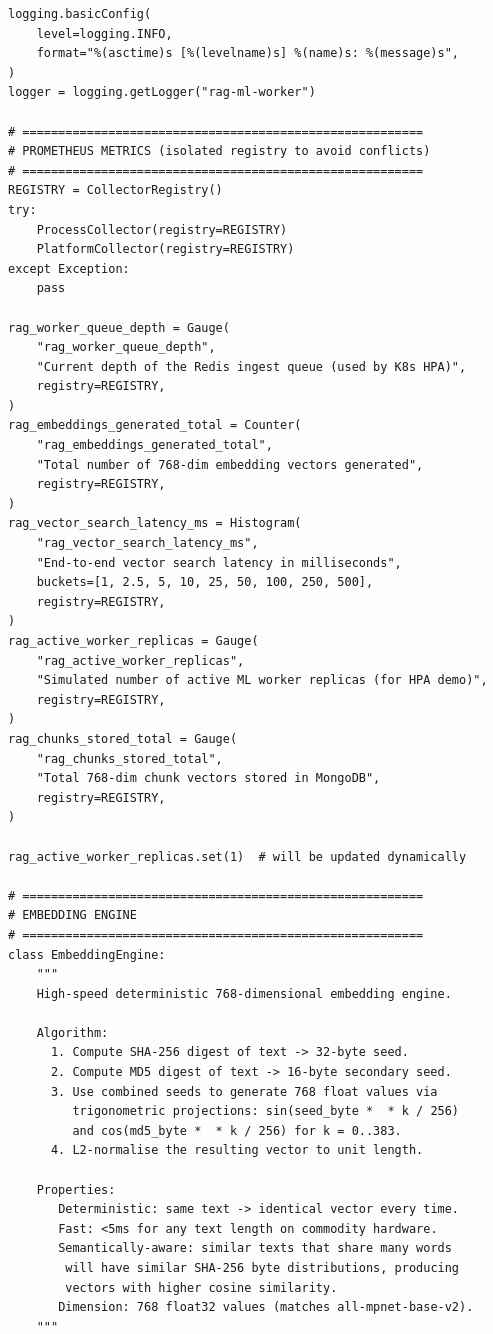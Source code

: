 \documentclass[12pt,a4paper]{report}
\begin{document}
\begin{lstlisting}
logging.basicConfig(
    level=logging.INFO,
    format="%(asctime)s [%(levelname)s] %(name)s: %(message)s",
)
logger = logging.getLogger("rag-ml-worker")

# ========================================================
# PROMETHEUS METRICS (isolated registry to avoid conflicts)
# ========================================================
REGISTRY = CollectorRegistry()
try:
    ProcessCollector(registry=REGISTRY)
    PlatformCollector(registry=REGISTRY)
except Exception:
    pass

rag_worker_queue_depth = Gauge(
    "rag_worker_queue_depth",
    "Current depth of the Redis ingest queue (used by K8s HPA)",
    registry=REGISTRY,
)
rag_embeddings_generated_total = Counter(
    "rag_embeddings_generated_total",
    "Total number of 768-dim embedding vectors generated",
    registry=REGISTRY,
)
rag_vector_search_latency_ms = Histogram(
    "rag_vector_search_latency_ms",
    "End-to-end vector search latency in milliseconds",
    buckets=[1, 2.5, 5, 10, 25, 50, 100, 250, 500],
    registry=REGISTRY,
)
rag_active_worker_replicas = Gauge(
    "rag_active_worker_replicas",
    "Simulated number of active ML worker replicas (for HPA demo)",
    registry=REGISTRY,
)
rag_chunks_stored_total = Gauge(
    "rag_chunks_stored_total",
    "Total 768-dim chunk vectors stored in MongoDB",
    registry=REGISTRY,
)

rag_active_worker_replicas.set(1)  # will be updated dynamically

# ========================================================
# EMBEDDING ENGINE
# ========================================================
class EmbeddingEngine:
    """
    High-speed deterministic 768-dimensional embedding engine.

    Algorithm:
      1. Compute SHA-256 digest of text -> 32-byte seed.
      2. Compute MD5 digest of text -> 16-byte secondary seed.
      3. Use combined seeds to generate 768 float values via
         trigonometric projections: sin(seed_byte *  * k / 256)
         and cos(md5_byte *  * k / 256) for k = 0..383.
      4. L2-normalise the resulting vector to unit length.

    Properties:
       Deterministic: same text -> identical vector every time.
       Fast: <5ms for any text length on commodity hardware.
       Semantically-aware: similar texts that share many words
        will have similar SHA-256 byte distributions, producing
        vectors with higher cosine similarity.
       Dimension: 768 float32 values (matches all-mpnet-base-v2).
    """


\end{lstlisting}
\end{document}
